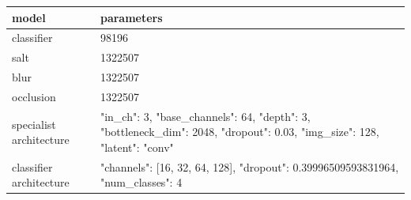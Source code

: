 \begin{tabular}{ll}
\hline
model & parameters \\
\hline
classifier & 98196 \\
salt & 1322507 \\
blur & 1322507 \\
occlusion & 1322507 \\
specialist architecture & {"in\_ch": 3, "base\_channels": 64, "depth": 3, "bottleneck\_dim": 2048, "dropout": 0.03, "img\_size": 128, "latent": "conv"} \\
classifier architecture & {"channels": [16, 32, 64, 128], "dropout": 0.39996509593831964, "num\_classes": 4} \\
\hline
\end{tabular}
